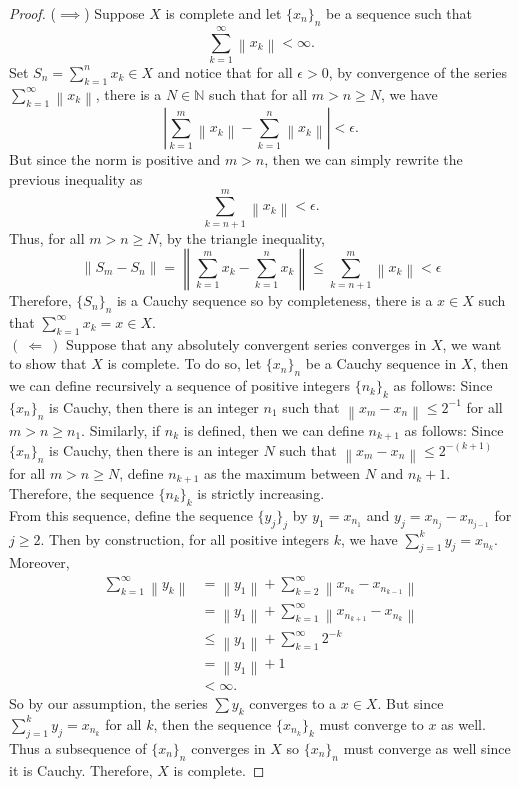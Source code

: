 \documentclass[12pt]{article}
\newcommand{\N}{\mathbb{N}}
\newcommand{\norm}[1]{\left\lVert#1 \right\rVert}
\newcommand{\abs}[1]{\left\lvert#1 \right\rvert}
\begin{document}
\begin{proof}
    ($\implies$) Suppose $X$ is complete and let $\{x_n\}_n$ be a sequence such that
    $$\sum_{k=1}^{\infty}\norm{x_k} < \infty.$$
    Set $S_n = \sum_{k=1}^{n}x_k \in X$ and notice that for all $\epsilon > 0$, by convergence of the series $\sum_{k=1}^{\infty}\norm{x_k}$, there is a $N \in \N$ such that for all $m > n \geq N$, we have
    $$\abs{\sum_{k=1}^{m}\norm{x_k} - \sum_{k=1}^{n}\norm{x_k}} < \epsilon.$$
    But since the norm is positive and $m > n$, then we can simply rewrite the previous inequality as
    $$\sum_{k=n+1}^{m}\norm{x_k} < \epsilon.$$
    Thus, for all $m > n \geq N$, by the triangle inequality,
    $$\norm{S_m - S_n} = \norm{\sum_{k=1}^{m}x_k - \sum_{k=1}^{n}x_k} \leq \sum_{k=n+1}^{m}\norm{x_k} < \epsilon$$
    Therefore, $\{S_n\}_n$ is a Cauchy sequence so by completeness, there is a $x \in X$ such that $\sum_{k=1}^{\infty}x_k = x \in X$. \\
    $( \ \Longleftarrow \ )$ Suppose that any absolutely convergent series converges in $X$, we want to show that $X$ is complete. To do so, let $\{x_n\}_n$ be a Cauchy sequence in $X$, then we can define recursively a sequence of positive integers $\{n_k\}_k$ as follows: Since $\{x_n\}_n$ is Cauchy, then there is an integer $n_1$ such that $\norm{x_m - x_n} \leq 2^{-1}$ for all $m > n \geq n_1$. Similarly, if $n_k$ is defined, then we can define $n_{k+1}$ as follows: Since $\{x_n\}_n$ is Cauchy, then there is an integer $N$ such that $\norm{x_m - x_n} \leq 2^{-(k+1)}$ for all $m > n \geq N$, define $n_{k+1}$ as the maximum between $N$ and $n_k + 1$. Therefore, the sequence $\{n_k\}_k$ is strictly increasing. \\
    From this sequence, define the sequence $\{y_j\}_j$ by $y_1 = x_{n_1}$ and $y_j = x_{n_j} - x_{n_{j-1}}$ for $j \geq 2$. Then by construction, for all positive integers $k$, we have $\sum_{j=1}^{k}y_j = x_{n_k}$. Moreover,
    \begin{align*}
        \sum_{k=1}^{\infty}\norm{y_k} &= \norm{y_1} + \sum_{k=2}^{\infty}\norm{x_{n_k} - x_{n_{k-1}}} \\
        &= \norm{y_1} + \sum_{k=1}^{\infty}\norm{x_{n_{k+1}} - x_{n_k}} \\
        &\leq \norm{y_1} + \sum_{k=1}^{\infty}2^{-k} \\
        &= \norm{y_1} + 1\\
        &< \infty.
    \end{align*}
    So by our assumption, the series $\sum y_k$ converges to a $x \in X$. But since $\sum_{j=1}^{k}y_j = x_{n_k}$ for all $k$, then the sequence $\{x_{n_k}\}_k$ must converge to $x$ as well. Thus a subsequence of $\{x_n\}_n$ converges in $X$ so $\{x_n\}_n$ must converge as well since it is Cauchy. Therefore, $X$ is complete.
\end{proof}
\end{document}
